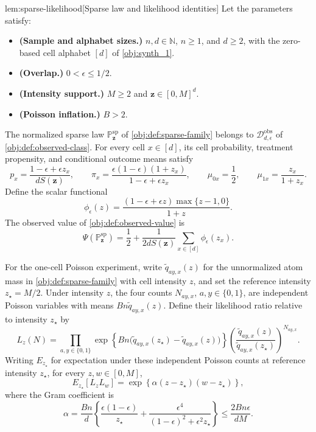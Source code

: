 \documentclass[11pt]{article}
\begin{document}
\begin{lemmav}{lem:sparse-likelihood}[Sparse law and likelihood identities]
Let the parameters satisfy:
\begin{itemize}
\item \textbf{(Sample and alphabet sizes.)} \(n,d\in\mathbb N\), \(n\ge1\), and \(d\ge2\), with the zero-based cell alphabet \([d]\) of \cref{obj:synth_1}.
\item \textbf{(Overlap.)} \(0<\epsilon\le1/2\).
\item \textbf{(Intensity support.)} \(M\ge2\) and \(\mathbf z\in[0,M]^d\).
\item \textbf{(Poisson inflation.)} \(B>2\).
\end{itemize}
The normalized sparse law \(\mathbb P_{\mathbf z}^{\mathrm{sp}}\) of \cref{obj:def:sparse-family} belongs to \(\mathcal D_{d,\epsilon}^{\mathrm{obs}}\) of \cref{obj:def:observed-class}. For every cell \(x\in[d]\), its cell probability, treatment propensity, and conditional outcome means satisfy
\[
p_x=\frac{1-\epsilon+\epsilon z_x}{dS(\mathbf z)},
\qquad
\pi_x=\frac{\epsilon(1-\epsilon)(1+z_x)}
{1-\epsilon+\epsilon z_x},
\qquad
\mu_{0x}=\frac12,
\qquad
\mu_{1x}=\frac{z_x}{1+z_x}.
\]
Define the scalar functional
\[
\phi_\epsilon(z)
=\frac{(1-\epsilon+\epsilon z)\max\{z-1,0\}}{1+z}.
\]
The observed value of \cref{obj:def:observed-value} is
\[
\Psi(\mathbb P_{\mathbf z}^{\mathrm{sp}})
=\frac12+\frac{1}{2dS(\mathbf z)}
\sum_{x\in[d]}\phi_\epsilon(z_x).
\]

For the one-cell Poisson experiment, write
\(\widetilde q_{ay,x}(z)\) for the unnormalized atom mass in
\cref{obj:def:sparse-family} with cell intensity \(z\), and set the reference intensity \(z_\star=M/2\). Under intensity \(z\), the four counts \(N_{ay,x}\), \(a,y\in\{0,1\}\), are independent Poisson variables with means \(Bn\widetilde q_{ay,x}(z)\). Define their likelihood ratio relative to intensity \(z_\star\) by
\[
L_z(N)
=
\prod_{a,y\in\{0,1\}}
\exp\!\left\{
Bn\bigl(\widetilde q_{ay,x}(z_\star)
-\widetilde q_{ay,x}(z)\bigr)
\right\}
\left(
\frac{\widetilde q_{ay,x}(z)}
{\widetilde q_{ay,x}(z_\star)}
\right)^{N_{ay,x}}.
\]
Writing \(E_{z_\star}\) for expectation under these independent Poisson counts at reference intensity \(z_\star\), for every \(z,w\in[0,M]\),
\[
E_{z_\star}[L_zL_w]
=\exp\!\left\{\alpha(z-z_\star)(w-z_\star)\right\},
\]
where the Gram coefficient is
\[
\alpha
=\frac{Bn}{d}
\left\{
\frac{\epsilon(1-\epsilon)}{z_\star}
+\frac{\epsilon^4}{(1-\epsilon)^2+\epsilon^2z_\star}
\right\}
\le \frac{2Bn\epsilon}{dM}.
\]
\end{lemmav}
\end{document}
